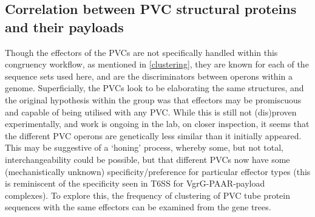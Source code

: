  
\subsection{Correlation between PVC structural proteins and their payloads}
 Though the effectors of the PVCs are not specifically handled within this congruency workflow, as mentioned in \vref{clustering}, they are known for each of the sequence sets used here, and are the discriminators between operons within a genome. Superficially, the PVCs look to be elaborating the same structures, and the original hypothesis within the group was that effectors may be promiscuous and capable of being utilised with any PVC. While this is still not (dis)proven experimentally, and work is ongoing in the lab, on closer inspection, it seems that the different PVC operons are genetically less similar than it initially appeared. This may be suggestive of a `honing' process, whereby some, but not total, interchangeability could be possible, but that different PVCs now have some (mechanistically unknown) specificity/preference for particular effector types (this is reminiscent of the specificity seen in T6SS for VgrG-PAAR-payload complexes). To explore this, the frequency of clustering of PVC tube protein sequences with the same effectors can be examined from the gene trees.
 
